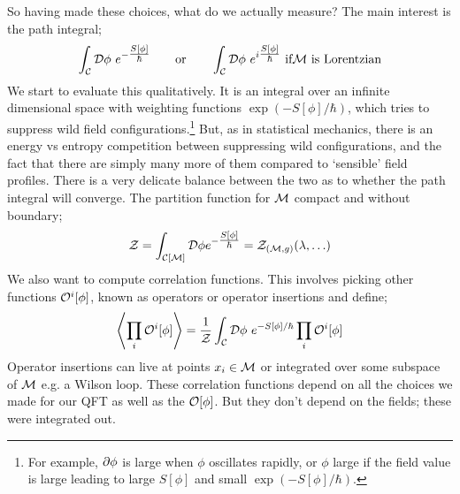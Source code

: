 So having made these choices, what do we actually measure? The main interest is the path integral;
\begin{equation}
\int_{\mC}{\mD \phi \,\, e^{-\tfrac{S\left[\phi\right]}{\hbar}}} \qquad \text{or} \qquad \int_{\mC}{\mD \phi \,\, e^{i\tfrac{S\left[\phi\right]}{\hbar}}} \text{ if} \mM \text{ is Lorentzian}
\end{equation}
We start to evaluate this qualitatively. It is an integral over an infinite dimensional space with weighting functions $\exp(-S[\phi]/\hbar)$, which tries to suppress wild field configurations.\footnote{For example, $\partial \phi$ is large when $\phi$ oscillates rapidly, or $\phi$ large if the field value is large leading to large $S[\phi]$ and small $\exp(-S[\phi]/\hbar)$.} But, as in statistical mechanics, there is an energy vs entropy competition between suppressing wild configurations, and the fact that there are simply many more of them compared to `sensible' field profiles. There is a very delicate balance between the two as to whether the path integral will converge. The partition function for $\mathcal{M}$ compact and without boundary;
\begin{equation}
\mathcal{Z} = \int_{\mathcal{C}[\mathcal{M}]}{\mathcal{D} \phi e^{-\tfrac{S[\phi]}{\hbar}}} = \mathcal{Z}_{(\mathcal{M}, g)}(\lambda, \ldots)
\end{equation}
We also want to compute correlation functions. This involves picking other functions $\mathcal{O}^i[\phi]$, known as operators or operator insertions and define;
\begin{equation}
\left< \prod_i {\mO^i[\phi]} \right> = \frac{1}{\mathcal{Z}}\int_{\mC}{\mD \phi \,\, e^{-S[\phi]/\hbar}\prod_i{\mO^i[\phi]}}
\end{equation}
Operator insertions can live at points $x_i \in \mathcal{M}$ or integrated over some subspace of $\mathcal{M}$ e.g. a Wilson loop. These correlation functions depend on all the choices we made for our QFT as well as the $\mathcal{O}[\phi]$. But they don't depend on the fields; these were integrated out.

